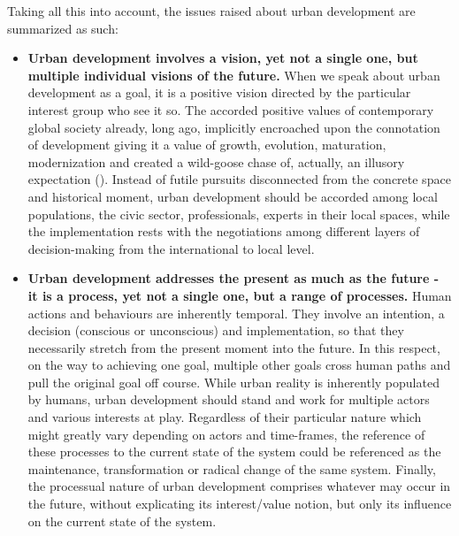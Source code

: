 \documentclass[11pt]{report}
\begin{document}
{{{Taking all this into account, the issues raised about urban development are summarized as such:

\begin{itemize}

\item \textbf{Urban development involves a vision, yet not a single one, but multiple individual visions of the future.}
When we speak about urban development as a goal, it is a positive vision directed by  the particular interest group who see it so.
The accorded positive values of contemporary global society already, long ago, implicitly encroached upon the connotation of development giving it a value of growth, evolution, maturation, modernization and created a wild-goose chase of, actually, an illusory expectation
(\href{Esteva}{\citealt{esteva_development_2010}}).
Instead of futile pursuits disconnected from the concrete space and historical moment, urban development should be accorded among local populations, the civic sector, professionals, experts in their local spaces, while the implementation rests with the negotiations among different layers of decision-making from the  international to local level.

\item \textbf{Urban development addresses the present as much as the future - it is a process, yet not a single one, but a range of processes.}
Human actions and behaviours are inherently temporal.
They involve an intention, a decision (conscious or unconscious) and implementation, so that they necessarily stretch from the present moment into the future. In this respect, on the way to achieving one goal, multiple other goals cross human paths and pull the original goal off course. While urban reality is inherently populated by humans, urban development should stand and work for multiple actors and various interests at play. Regardless of their particular nature which might greatly vary depending on actors and time-frames, the reference of these processes to the current state of the system could be referenced as the maintenance, transformation or radical change of the same system. Finally, the processual nature of urban development comprises whatever may occur in the future, without explicating its interest/value notion, but only its influence on the current state of the system.


\end{itemize}}}}
\end{document}

